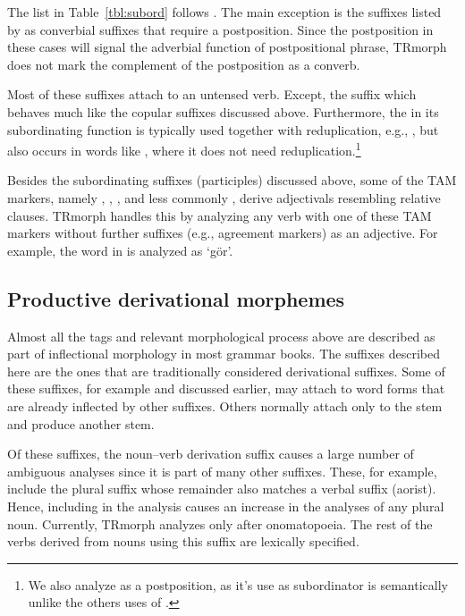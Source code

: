 \documentclass[twocolumn]{article}
\begin{document}
The list in Table~\ref{tbl:subord} follows \cite{goksel2005}. The main
exception is the suffixes listed by \cite{goksel2005} as converbial
suffixes that require a postposition. Since the postposition in these
cases will signal the adverbial function of postpositional phrase,
TRmorph does not mark the complement of the postposition as a converb.

%
%

Most of these suffixes attach to an untensed verb. Except, the suffix
 which behaves much like the copular suffixes discussed
above. Furthermore, the  in its subordinating function
is typically used together with reduplication, e.g., , but also occurs in words like
, where it does not need reduplication.\footnote{We
also analyze  as a postposition, as it's use as
subordinator is semantically unlike the others uses of .}

Besides the subordinating suffixes (participles) discussed above, some
of the TAM markers, namely , , ,
 and less commonly , derive adjectivals
resembling relative clauses. TRmorph handles this by analyzing any
verb with one of these TAM markers without further suffixes (e.g.,
agreement markers) as an adjective. For example, the word
 in  is analyzed as
`gör'.

\subsection{Productive derivational morphemes}

Almost all the tags and relevant morphological process above are
described as part of inflectional morphology in most grammar books.
The suffixes described here are the ones that are traditionally
considered derivational suffixes. Some of these suffixes, for example
 and  discussed earlier, may attach to word forms
that are already inflected by other suffixes. Others normally attach
only to the stem and produce another stem.

Of these suffixes, the noun--verb derivation suffix  causes a
large number of ambiguous analyses since it is part of many other
suffixes. These, for example, include the plural suffix 
whose remainder  also matches a verbal suffix (aorist).
Hence, including  in the analysis causes an increase in the
analyses of any plural noun. Currently, TRmorph analyzes 
only after onomatopoeia. The rest of the verbs derived from nouns
using this suffix are lexically specified.
\end{document}
